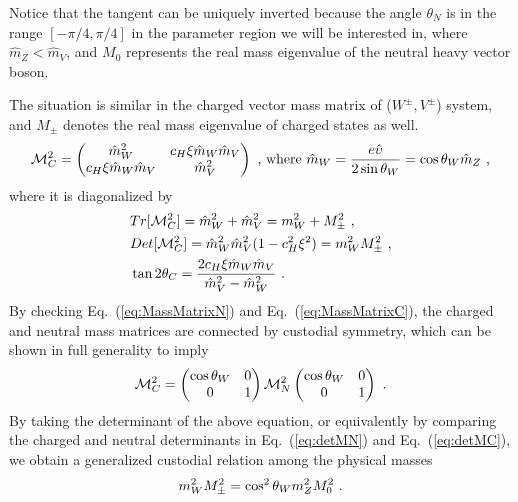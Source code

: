 Notice that the tangent can be uniquely inverted because the angle $\theta_{N}$ is in the range $[-\pi/4,\pi/4]$ in the parameter region we will be interested in, where $\hat{m}_{Z}<\hat{m}_{V}$, and $M_{0}$ represents the real mass eigenvalue of the neutral heavy vector boson.

The situation is similar in the charged vector mass matrix of ($W^{\pm},V^{\pm}$) system, and $M_{\pm}$ denotes the real mass eigenvalue of charged states as well.
\begin{align}
  \label{eq:MassMatrixC}
  \mathcal{M}_{C}^{2}=
  \begin{pmatrix}
    \hat{m}_{W}^{2} & c_{H}\xi \hat{m}_{W} \hat{m}_{V}\\
    c_{H}\xi \hat{m}_{W} \hat{m}_{V} & \hat{m}_{V}^{2}
  \end{pmatrix}
  \textup{ , where }
  \hat{m}_{W}=\frac{e\hat{\upsilon}}{2\sin{\theta_{W}}}=\cos{\theta_{W}}\hat{m}_{Z}
  \textup{ ,}
\end{align}
where it is diagonalized by
\begin{align}
  \label{eq:detMC}
  &Tr[\mathcal{M}_{C}^{2}]=\hat{m}_{W}^{2}+\hat{m}_{V}^{2}=m_{W}^{2}+M_{\pm}^{2}\textup{ ,}\nonumber\\
  &Det[\mathcal{M}_{C}^{2}]=\hat{m}_{W}^{2}\hat{m}_{V}^{2}(1-c_{H}^{2}\xi^{2})=m_{W}^{2}M_{\pm}^{2}\textup{ ,}\nonumber\\
  &\tan{2\theta_{C}}=\frac{2c_{H}\xi \hat{m}_{W} \hat{m}_{V}}{\hat{m}_{V}^{2}-\hat{m}_{W}^{2}}\textup{ .}
\end{align}
By checking Eq.~(\ref{eq:MassMatrixN}) and Eq.~(\ref{eq:MassMatrixC}), the charged and neutral mass matrices are connected by custodial symmetry, which can be shown in full generality to imply
\begin{align}
  \mathcal{M}_{C}^{2}=
  \begin{pmatrix}
    \cos{\theta_{W}} & 0\\
    0&1
  \end{pmatrix}
  \mathcal{M}_{N}^{2}
  \begin{pmatrix}
    \cos{\theta_{W}} & 0\\
    0&1
  \end{pmatrix}
  \textup{ .}
\end{align}
By taking the determinant of the above equation, or equivalently by comparing the charged and neutral determinants in Eq.~(\ref{eq:detMN}) and Eq.~(\ref{eq:detMC}), we obtain a generalized custodial relation among the physical masses
\begin{align}
  \label{eq:custRelation}
m_{W}^{2}M_{\pm}^{2}=\cos^{2}\theta_{W}m_{Z}^{2}M_{0}^{2}\textup{ .}
\end{align}

